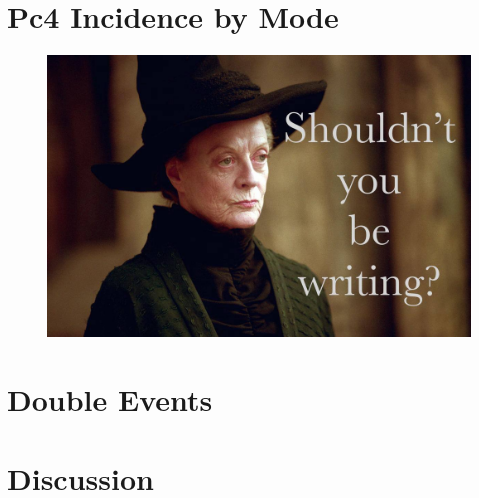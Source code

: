 \section{Pc4 Incidence by Mode}
  \label{sec_rate}

\begin{figure}[!htb]
    \centering
    \includegraphics[width=\textwidth]{figures/placeholder.jpg}
    \caption[Distribution of Events by Spectral Width]{
    }
    \label{fig_fwhm}
\end{figure}

\section{Double Events}
  \label{sec_double}

\todo{$\cdots$}



\section{Discussion}

